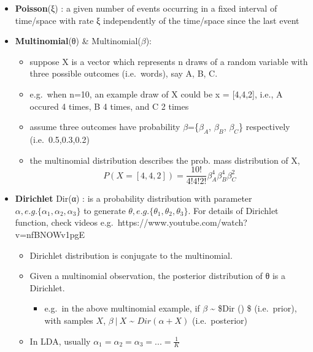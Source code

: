\documentclass[11pt]{article}
\providecommand{\tightlist}{%
      \setlength{\itemsep}{0pt}\setlength{\parskip}{0pt}}
\begin{document}
\begin{itemize}
\tightlist
\item
  \textbf{Poisson}(ξ) : a given number of events occurring in a fixed
  interval of time/space with rate ξ independently of the time/space
  since the last event
\item
  \textbf{Multinomial}(θ) \& Multinomial(\(\beta\)):

  \begin{itemize}
  \tightlist
  \item
    suppose X is a vector which represents n draws of a random variable
    with three possible outcomes (i.e.~words), say A, B, C.
  \item
    e.g.~when n=10, an example draw of X could be x = {[}4,4,2{]}, i.e.,
    A occured 4 times, B 4 times, and C 2 times
  \item
    assume three outcomes have probability \(\beta\)=\{\(\beta_A\),
    \(\beta_B\), \(\beta_C\)\} respectively (i.e.~0.5,0.3,0.2)
  \item
    the multinomial distribution describes the prob. mass distribution
    of X,
    \[ P(X=[4,4,2]) = \frac{10!}{4!4!2!}\beta_A^{4}\beta_B^{4}\beta_C^{2}\]
  \end{itemize}
\item
  \textbf{Dirichlet} Dir(α) : is a probability distribution with
  parameter \(α, e.g. \{α_1,α_2,α_3\}\) to generate
  \(θ, e.g. \{ θ_1,θ_2,θ_3\}\). For details of Dirichlet function, check
  videos e.g.~https://www.youtube.com/watch?v=nfBNOWv1pgE

  \begin{itemize}
  \tightlist
  \item
    Dirichlet distribution is conjugate to the multinomial.
  \item
    Given a multinomial observation, the posterior distribution of θ is
    a Dirichlet.

    \begin{itemize}
    \tightlist
    \item
      e.g.~in the above multinomial example, if \(\beta\)
      \textasciitilde{} \$Dir (\alpha) \$ (i.e.~prior), with samples
      \(X\), \(\beta~|~X\) \textasciitilde{} \(Dir (\alpha + X)\)
      (i.e.~posterior)
    \end{itemize}
  \item
    In LDA, usually \(α_1=α_2=α_3=...=\frac{1}{K}\)
  \end{itemize}
\end{itemize}
\end{document}
